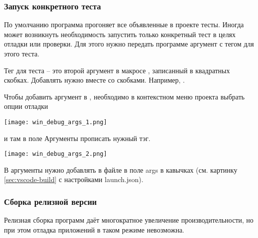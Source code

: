 \subsubsection{Запуск конкретного теста}
\label{sec:run-test}

По умолчанию программа  прогоняет все объявленные в проекте тесты. Иногда может возникнуть необходимость
запустить только конкретный тест в целях отладки или проверки.
Для этого нужно передать программе аргумент с тегом для этого теста.

Тег для теста -- это второй аргумент в макросе , записанный в квадратных скобках.
Добавлять нужно вместе со скобками. Например, \cvar{[ping]}.

Чтобы добавить аргумент в , необходимо в контекстном меню проекта  выбрать опции отладки
\begin{center}
\texttt{[image: win\_debug\_args\_1.png]}
\end{center}
и там в поле Аргументы прописать нужный тэг.
\begin{center}
\texttt{[image: win\_debug\_args\_2.png]}
\end{center}

В  аргументы нужно добавлять в файле  в поле args в кавычках
(см. картинку \ref{sec:vscode-build} с настройками launch.json).

\subsubsection{Сборка релизной версии}
\label{sec:release-build}

Релизная сборка программ даёт многократное увеличение производительности,
но при этом отладка приложений в таком режиме невозможна.

